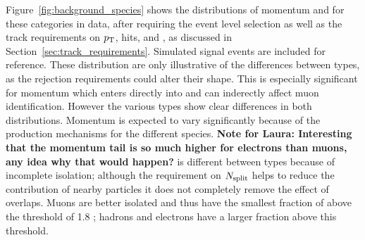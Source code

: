 Figure~\ref{fig:background_species} shows the distributions of momentum and \dedx for these categories in data, after requiring the event level selection as well as the track requirements on $p_{\mathrm{T}}$, hits, and \Nsplit, as discussed in Section~\ref{sec:track_requirements}.
Simulated signal events are included for reference.
These distribution are only illustrative of the differences between types, as the rejection requirements could alter their shape. This is especially significant for momentum which enters directly into \ep and can inderectly affect muon identification.
However the various types show clear differences in both distributions.
Momentum is expected to vary significantly because of the production mechanisms for the different species. \textbf{Note for Laura: Interesting that the momentum tail is so much higher for electrons than muons, any idea why that would happen?}
\dedx is different between types because of incomplete isolation; although the requirement on $N_{\mathrm{split}}$ helps to reduce the contribution of nearby particles it does not completely remove the effect of overlaps.
Muons are better isolated and thus have the smallest fraction of \dedx above the threshold of 1.8 \MeVgcm; hadrons and electrons have a larger fraction above this threshold.

